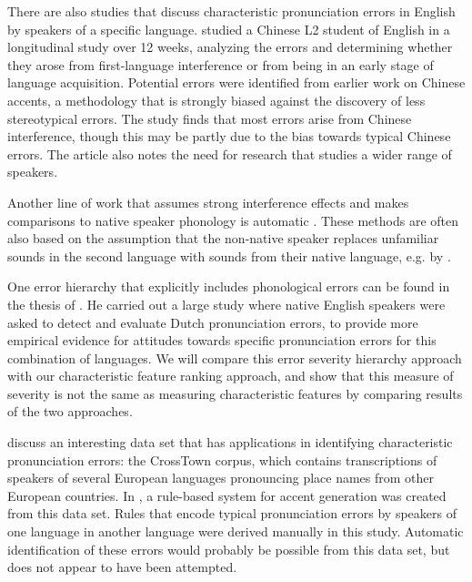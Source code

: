 \documentclass[output=paper]{LSP/langsci}
\begin{document}
There are also studies that discuss characteristic pronunciation errors in English by speakers of a specific language. \citet{gao_pronunciation_2005} studied a Chinese L2 student of English in a longitudinal study over 12 weeks, analyzing the errors and determining whether they arose from first-language interference or from being in an early stage of language acquisition. Potential errors were identified from earlier work on Chinese accents, a methodology that is strongly biased against the discovery of less stereotypical errors. The study finds that most errors arise from Chinese interference, though this may be partly due to the bias towards typical Chinese errors. The article also notes the need for research that studies a wider range of speakers.

Another line of work that assumes strong interference effects and makes comparisons to native speaker phonology is automatic . These methods are often also based on the assumption that the non-native speaker replaces unfamiliar sounds in the second language with sounds from their native language, e.g. by \citet{angkititrakul_advances_2006}.

One error hierarchy that explicitly includes phonological errors can be found in the thesis of \citet{van_den_doel_evaluation_2006}. He carried out a large study where native English speakers were asked to detect and evaluate Dutch pronunciation errors, to provide more empirical evidence for attitudes towards specific pronunciation errors for this combination of languages. We will compare this error severity hierarchy approach with our characteristic feature ranking approach, and show that this measure of severity is not the same as measuring characteristic features by comparing results of the two approaches.

\citet{schaden_casselberveetovallarga_2006} discuss an interesting data set that has applications in identifying characteristic pronunciation errors: the CrossTown corpus, which contains transcriptions of speakers of several European languages pronouncing place names from other European countries. In \citet{schaden_crosstowns_2004}, a rule-based system for accent generation was created from this data set. Rules that encode typical pronunciation errors by speakers of one language in another language were derived manually in this study. Automatic identification of these errors would probably be possible from this data set, but does not appear to have been attempted.
\end{document}
